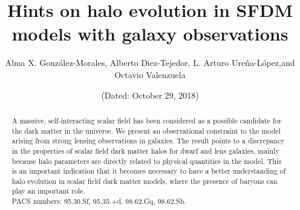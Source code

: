 \documentclass[10pt,a4paper]{article}
\title{{\large\textbf{Hints on halo evolution in SFDM models with galaxy observations}}}
\author{\small{Alma X. González-Morales, Alberto Diez-Tejedor, L. Arturo Ureña-López,and Octavio  Valenzuela}}
\date{\footnotesize{(Dated: October 29, 2018)}}
\begin{document}
\maketitle

\begin{abstract}
\small{
A massive, self-interacting scalar field has been considered as a possible candidate for the dark matter in the universe. We present an observational constraint to the model arising from strong lensing observations in galaxies. The result points to a discrepancy in the properties of scalar field dark matter halos for dwarf and lens galaxies, mainly because halo parameters are directly related to physical quantities in the model. This is an important indication that it becomes necessary to have a better understanding of halo evolution in scalar field dark matter models, where the presence of baryons can play an important role.\\

\noindent PACS numbers:  95.30.Sf, 95.35.+d, 98.62.Gq, 98.62.Sb.}
\end{abstract}
\end{document}
